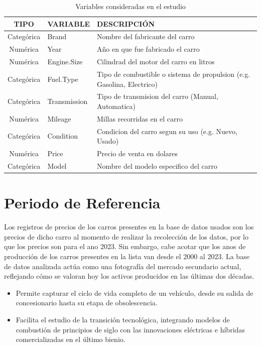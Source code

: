\documentclass[oneside,11pt]{Latex/Classes/PhDthesisPSnPDF}
\begin{document}
\begin{table}[ht]
\centering
\caption{Variables consideradas en el estudio} 
\resizebox{15cm}{!} {
\begin{tabular}{cll}
  \hline
  \textbf{TIPO} & \textbf{VARIABLE} & \textbf{DESCRIPCIÓN} \\ 
  \hline
  Categórica & Brand & Nombre del fabricante del carro \\ 
  Numérica & Year & Año en que fue fabricado el carro \\ 
  Numérica & Engine.Size & Cilindrad del motor del carro en litros  \\ 
  Categórica & Fuel.Type & Tipo de combustible o sistema de propulsion (e.g. Gasolina, Electrico) \\ 
  Categórica & Transmission & Tipo de transmision del carro (Manual, Automatica) \\ 
  Numérica & Mileage & Millas recorridas en el carro \\ 
  Categórica & Condition & Condicion del carro segun su uso (e.g. Nuevo, Usado) \\ 
  Numérica & Price & Precio de venta en dolares \\ 
  Categórica & Model & Nombre del modelo especifico del carro \\ 
   \hline
\end{tabular}
}
\end{table}

\section{Periodo de Referencia}

Los registros de precios de los carros presentes en la base de datos
usados son los precios de dicho carro al momento de realizar la
recolección de los datos, por lo que los precios son para el ano 2023.
Sin embargo, cabe acotar que los anos de producción de los carros
presentes en la lista van desde el 2000 al 2023. La base de datos
analizada actúa como una fotografía del mercado secundario actual,
reflejando cómo se valoran hoy los activos producidos en las últimas dos
décadas.

\begin{itemize}
  \item Permite capturar el ciclo de vida completo de un vehículo, desde su salida de concesionario hasta su etapa de obsolescencia.
  \item Facilita el estudio de la transición tecnológica, integrando modelos de combustión de principios de siglo con las innovaciones eléctricas e híbridas comercializadas en el último bienio. \end{itemize}
\end{document}
